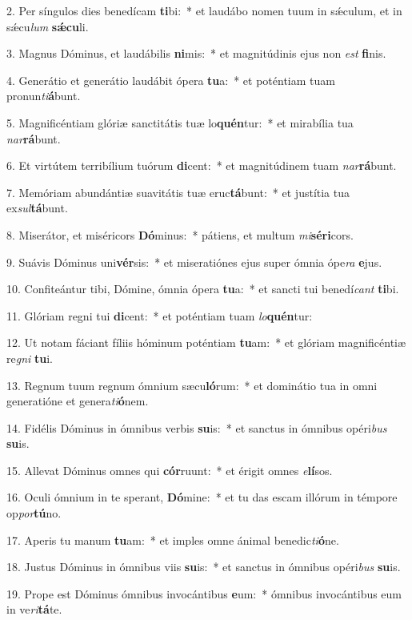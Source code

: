 2. Per síngulos dies benedícam \textbf{ti}bi:~*  et laudábo nomen tuum in sǽculum, et in sǽcu\textit{lum} \textbf{sǽ}\textbf{cu}li.\

3. Magnus Dóminus, et laudábilis \textbf{ni}mis:~*  et magnitúdinis ejus non \textit{est} \textbf{fi}nis.\

4. Generátio et generátio laudábit ópera \textbf{tu}a:~*  et poténtiam tuam pronun\textit{ti}\textbf{á}bunt.\

5. Magnificéntiam glóriæ sanctitátis tuæ lo\textbf{quén}tur:~*  et mirabília tua \textit{nar}\textbf{rá}bunt.\

6. Et virtútem terribílium tuórum \textbf{di}cent:~*  et magnitúdinem tuam \textit{nar}\textbf{rá}bunt.\

7. Memóriam abundántiæ suavitátis tuæ eruc\textbf{tá}bunt:~*  et justítia tua ex\textit{sul}\textbf{tá}bunt.\

8. Miserátor, et miséricors \textbf{Dó}minus:~*  pátiens, et multum \textit{mi}\textbf{sé}\textbf{ri}cors.\

9. Suávis Dóminus uni\textbf{vér}sis:~*  et miseratiónes ejus super ómnia ópe\textit{ra} \textbf{e}jus.\

10. Confiteántur tibi, Dómine, ómnia ópera \textbf{tu}a:~*  et sancti tui benedí\textit{cant} \textbf{ti}bi.\

11. Glóriam regni tui \textbf{di}cent:~*  et poténtiam tuam \textit{lo}\textbf{quén}tur:\

12. Ut notam fáciant fíliis hóminum poténtiam \textbf{tu}am:~*  et glóriam magnificéntiæ re\textit{gni} \textbf{tu}i.\

13. Regnum tuum regnum ómnium sæcu\textbf{ló}rum:~*  et dominátio tua in omni generatióne et genera\textit{ti}\textbf{ó}nem.\

14. Fidélis Dóminus in ómnibus verbis \textbf{su}is:~*  et sanctus in ómnibus opéri\textit{bus} \textbf{su}is.\

15. Allevat Dóminus omnes qui \textbf{cór}ruunt:~*  et érigit omnes \textit{e}\textbf{lí}sos.\

16. Oculi ómnium in te sperant, \textbf{Dó}mine:~*  et tu das escam illórum in témpore op\textit{por}\textbf{tú}no.\

17. Aperis tu manum \textbf{tu}am:~*  et imples omne ánimal benedic\textit{ti}\textbf{ó}ne.\

18. Justus Dóminus in ómnibus viis \textbf{su}is:~*  et sanctus in ómnibus opéri\textit{bus} \textbf{su}is.\

19. Prope est Dóminus ómnibus invocántibus \textbf{e}um:~*  ómnibus invocántibus eum in ve\textit{ri}\textbf{tá}te.\

